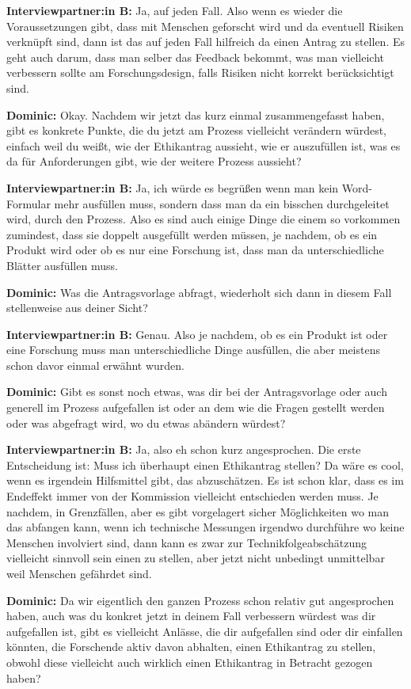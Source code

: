 \documentclass[a4paper,12pt,twoside,numbers=noendperiod]{scrreprt}
\begin{document}
\textbf{Interviewpartner:in B:} Ja, auf jeden Fall. Also wenn es wieder die Voraussetzungen gibt, dass mit Menschen geforscht wird und da eventuell Risiken verknüpft sind, dann ist das auf jeden Fall hilfreich da einen Antrag zu stellen. Es geht auch darum, dass man selber das Feedback bekommt, was man vielleicht verbessern sollte am Forschungsdesign, falls Risiken nicht korrekt berücksichtigt sind.

\textbf{Dominic:} Okay. Nachdem wir jetzt das kurz einmal zusammengefasst haben, gibt es konkrete Punkte, die du jetzt am Prozess vielleicht verändern würdest, einfach weil du weißt, wie der Ethikantrag aussieht, wie er auszufüllen ist, was es da für Anforderungen gibt, wie der weitere Prozess aussieht?

\textbf{Interviewpartner:in B:} Ja, ich würde es begrüßen wenn man kein Word-Formular mehr ausfüllen muss, sondern dass man da ein bisschen durchgeleitet wird, durch den Prozess. Also es sind auch einige Dinge die einem so vorkommen zumindest, dass sie doppelt ausgefüllt werden müssen, je nachdem, ob es ein Produkt wird oder ob es nur eine Forschung ist, dass man da unterschiedliche Blätter ausfüllen muss.

\textbf{Dominic:} Was die Antragsvorlage abfragt, wiederholt sich dann in diesem Fall stellenweise aus deiner Sicht?

\textbf{Interviewpartner:in B:} Genau. Also je nachdem, ob es ein Produkt ist oder eine Forschung muss man unterschiedliche Dinge ausfüllen, die aber meistens schon davor einmal erwähnt wurden.

\textbf{Dominic:} Gibt es sonst noch etwas, was dir bei der Antragsvorlage oder auch generell im Prozess aufgefallen ist oder an dem wie die Fragen gestellt werden oder was abgefragt wird, wo du etwas abändern würdest?

\textbf{Interviewpartner:in B:} Ja, also eh schon kurz angesprochen. Die erste Entscheidung ist: Muss ich überhaupt einen Ethikantrag stellen? Da wäre es cool, wenn es irgendein Hilfsmittel gibt, das abzuschätzen. Es ist schon klar, dass es im Endeffekt immer von der Kommission vielleicht entschieden werden muss. Je nachdem, in Grenzfällen, aber es gibt vorgelagert sicher Möglichkeiten wo man das abfangen kann, wenn ich technische Messungen irgendwo durchführe wo keine Menschen involviert sind, dann kann es zwar zur Technikfolgeabschätzung vielleicht sinnvoll sein einen zu stellen, aber jetzt nicht unbedingt unmittelbar weil Menschen gefährdet sind.

\textbf{Dominic:} Da wir eigentlich den ganzen Prozess schon relativ gut angesprochen haben, auch was du konkret jetzt in deinem Fall verbessern würdest was dir aufgefallen ist, gibt es vielleicht Anlässe, die dir aufgefallen sind oder dir einfallen könnten, die Forschende aktiv davon abhalten, einen Ethikantrag zu stellen, obwohl diese vielleicht auch wirklich einen Ethikantrag in Betracht gezogen haben?
\end{document}
